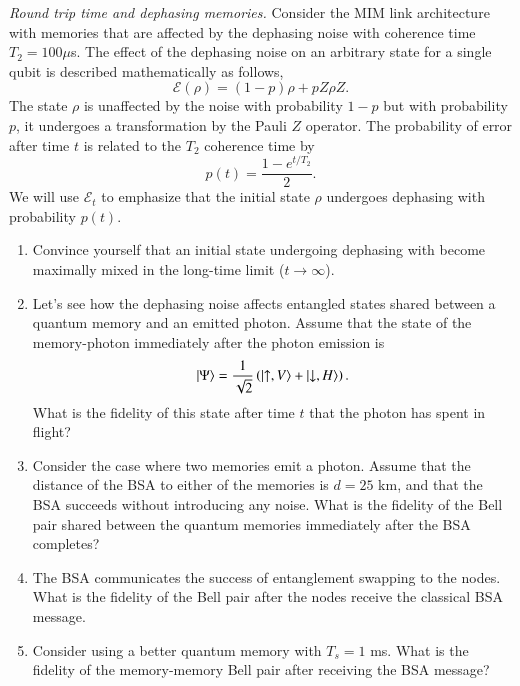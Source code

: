 \begin{exercise}
\emph{Round trip time and dephasing memories.} Consider the MIM link architecture with memories that are affected by the dephasing noise with coherence time $T_2=100\mu$s. The effect of the dephasing noise on an arbitrary state \ket{\rho} for a single qubit is described mathematically as follows,
\begin{equation*}
    \mathcal{E}(\rho) = (1-p) \rho + p Z\rho Z.
\end{equation*}
The state $\rho$ is unaffected by the noise with probability $1-p$ but with probability $p$, it undergoes a transformation by the Pauli $Z$ operator.
The probability of error after time $t$ is related to the $T_2$ coherence time by
\begin{equation*}
    p(t)=\frac{1-e^{t/T_2}}{2}.
\end{equation*}
We will use $\mathcal{E}_t$ to emphasize that the initial state $\rho$ undergoes dephasing with probability $p(t)$.
\begin{enumerate}[label=(\alph*)]
    \item Convince yourself that an initial state \ket{+} undergoing dephasing with become maximally mixed in the long-time limit ($t\rightarrow\infty$).
    \item Let's see how the dephasing noise affects entangled states shared between a quantum memory and an emitted photon. Assume that the state of the memory-photon immediately after the photon emission is
    \begin{equation*}
        \left| \Psi \right\rangle = \frac{1}{\sqrt{2}} \left( \left| \uparrow,V \right\rangle + \left| \downarrow,H \right\rangle \right).
    \end{equation*}
    What is the fidelity of this state after time $t$ that the photon has spent in flight?
    \item Consider the case where two memories emit a photon. Assume that the distance of the BSA to either of the memories is $d=25$ km, and that the BSA succeeds without introducing any noise. What is the fidelity of the Bell pair shared between the quantum memories immediately after the BSA completes?
    \item The BSA communicates the success of entanglement swapping to the nodes. What is the fidelity of the Bell pair after the nodes receive the classical BSA message.
    \item Consider using a better quantum memory with $T_s=1$ ms. What is the fidelity of the memory-memory Bell pair after receiving the BSA message?
\end{enumerate}
\end{exercise}
